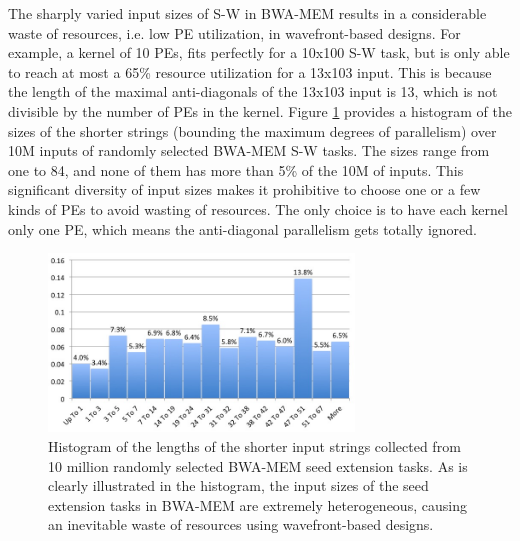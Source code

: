 The sharply varied input sizes of S-W in BWA-MEM results in a considerable waste of resources, i.e. low PE utilization, in wavefront-based designs. 
For example, a kernel of 10 PEs, fits perfectly for a 10x100 S-W task, but is only able to reach at most a 65\% resource utilization for a 13x103 input. 
This is because the length of the maximal anti-diagonals of the 13x103 input is 13, 
which is not divisible by the number of PEs in the kernel.
Figure \ref{fig:F4C2} provides a histogram of the sizes of the shorter strings (bounding the maximum degrees of parallelism) over 10M inputs of randomly selected BWA-MEM S-W tasks. 
The sizes range from one to 84, and none of them has more than 5\% of the 10M of inputs. 
This significant diversity of input sizes makes it prohibitive to choose one or a few kinds of PEs to avoid wasting of resources.
The only choice is to have each kernel only one PE, which means the anti-diagonal parallelism gets totally ignored.
\begin{figure}[!hbt]
	\begin{center}
		\includegraphics[width=3.2in]{Figures/Figure4C2.jpg}
		\caption {Histogram of the lengths of the shorter input strings collected from 10 million randomly selected BWA-MEM seed extension tasks. As is clearly illustrated in the histogram, the input sizes of the seed extension tasks in BWA-MEM are extremely heterogeneous, causing an inevitable waste of resources using wavefront-based designs.}
		\label{fig:F4C2}
	\end{center}
\end{figure}

